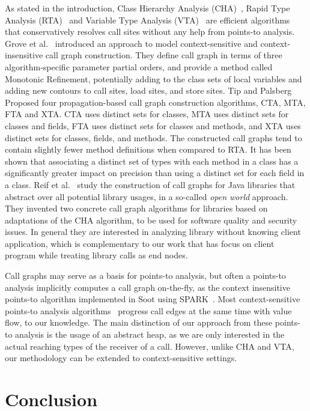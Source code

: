 \documentclass{llncs}
\begin{document}
As stated in the introduction, Class Hierarchy Analysis (CHA)~\cite{Dean1995,Fernandez1995}, Rapid Type Analysis (RTA)~\cite{Bacon1996} and Variable Type Analysis (VTA)~\cite{Sundaresan2000} are efficient algorithms that conservatively resolves call sites without any help from points-to analysis. Grove et al.~\cite{Grove1997} introduced an approach to model context-sensitive and context-insensitive call graph construction. They define call graph in terms of three algorithm-specific parameter partial orders, and provide a method called Monotonic Refinement, potentially adding to the class sets of local variables and adding new contours to call sites, load sites, and store sites. Tip and Palsberg~\cite{Tip2000} Proposed four propagation-based call graph construction algorithms, CTA, MTA, FTA and XTA. CTA uses distinct sets for classes, MTA uses distinct sets for classes and fields, FTA uses distinct sets for classes and methods, and XTA uses distinct
sets for classes, fields, and methods. The constructed call graphs tend to contain slightly fewer method definitions when compared to RTA. It has been shown that associating a distinct set of types with each method in a class has a significantly greater impact on precision than using a distinct set for each field in a class. Reif et al.~\cite{Reif2016} study the construction of call graphs for Java libraries that abstract over all potential library usages, in a so-called \emph{open world} approach. They invented two concrete call graph algorithms for libraries based on adaptations of the CHA algorithm, to be used for software quality and security issues. In general they are interested in analyzing library without knowing client application, which is complementary to our work that has focus on client program while treating library calls as end nodes.

Call graphs may serve as a basis for points-to analysis, but often a points-to analysis implicitly computes a call graph on-the-fly, as the context insensitive points-to algorithm implemented in Soot using SPARK~\cite{Lhotak2003}. Most context-sensitive points-to analysis algorithms~\cite{Milanova2005,Sridharan2006,Smaragdakis11,Tan16} progress call edges at the same time with value flow, to our knowledge. The main distinction of our approach from these points-to analysis is the usage of an abstract heap, as we are only interested in the actual reaching types of the receiver of a call. However, unlike CHA and VTA, our methodology can be extended to context-sensitive settings.

\section{Conclusion}\label{sec:conclusion}
\end{document}
